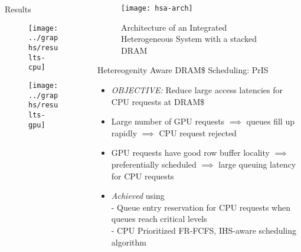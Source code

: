\documentclass[final,t]{beamer}
\newcommand*\circled[1]{\tikz[baseline=(char.base)]{
            \node[shape=circle,draw,inner sep=2pt] (char) {#1};}}
\begin{document}
\begin{frame}[t,fragile]{}
\begin{columns}[t]
\begin{column}{.47\linewidth}
\begin{exampleblock}{Results}
                \begin{figure}
			    	\texttt{[image: ../graphs/results-cpu]}
			    \end{figure}
			    \begin{figure}
			    	\texttt{[image: ../graphs/results-gpu]}
			    \end{figure}        			

\end{exampleblock}

\end{column}
\begin{column}{.47\linewidth}

	\begin{figure}
		\centering
    	\texttt{[image: hsa-arch]} \\
    	\caption{Architecture of an Integrated Heterogeneous System with a stacked DRAM}
    \end{figure}

    \begin{exampleblock}{ \circled{1} Hetereogenity Aware DRAM\$ Scheduling: PrIS}
    \begin{itemize}
    	\item \emph{OBJECTIVE:} Reduce large access latencies for CPU requests at DRAM\$
    	\item Large number of GPU requests $\implies$ queues fill up rapidly $\implies$ CPU request rejected
    	\item GPU requests have good row buffer locality $\implies$ preferentially scheduled $\implies$ large queuing latency for CPU requests
    	\item \emph{Achieved} using \\
    	\qquad - Queue entry reservation for CPU requests when queues reach critical levels \\
    	\qquad - CPU Prioritized FR-FCFS, IHS-aware scheduling algorithm
    \end{itemize} 
	\end{exampleblock}
	    

\end{column}
\end{columns}
\end{frame}
\end{document}
